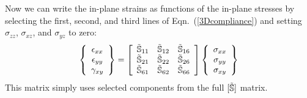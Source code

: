 \documentclass[11pt]{article}
\begin{document}
Now we can write the in-plane strains as functions of the in-plane stresses by selecting the first, second, and third lines of Eqn.~(\ref{3Dcompliance}) and setting $\sigma_{zz}$, $\sigma_{xz}$, and $\sigma_{yz}$ to zero:
\begin{equation}
        \left\{ \begin{array}{c}
           \epsilon_{xx}  \\  \epsilon_{yy}  \\  \gamma_{xy}
           \end{array} \right\}
           =
              \left[ \begin{array}{ccc}
     \tilde{\mathbb{S}}_{11} &  \tilde{\mathbb{S}}_{12} &   \tilde{\mathbb{S}}_{16} \\
     \tilde{\mathbb{S}}_{21} &  \tilde{\mathbb{S}}_{22} &   \tilde{\mathbb{S}}_{26} \\
     \tilde{\mathbb{S}}_{61} &  \tilde{\mathbb{S}}_{62} &   \tilde{\mathbb{S}}_{66} 
    \end{array} \right] 
    \left\{ \begin{array}{c}
           \sigma_{xx}  \\  \sigma_{yy}  \\   \sigma_{xy}
           \end{array} \right\}
     \label{2Dcompliance}
 \end{equation}
 This matrix simply uses selected components from the full $[ \tilde{\mathbb{S}} ]$ matrix.  
 
\end{document}
